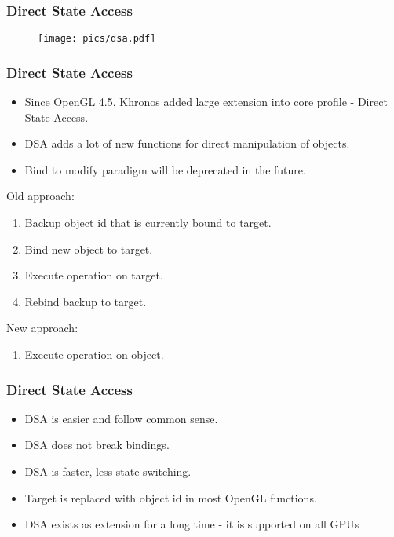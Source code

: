 
\begin{frame}[fragile]
\frametitle{Direct State Access}
	\begin{figure}[h]
	\texttt{[image: pics/dsa.pdf]}
	\end{figure}
\end{frame}

\begin{frame}
  \frametitle{Direct State Access}
  \begin{itemize}
    \item Since OpenGL 4.5, Khronos added large extension into core profile - Direct State Access.
    \item DSA adds a lot of new functions for direct manipulation of objects.
    \item Bind to modify paradigm will be deprecated in the future.
  \end{itemize}
  Old approach:
  \begin{enumerate}
    \item Backup object id that is currently bound to target.
    \item Bind new object to target.
    \item Execute operation on target.
    \item Rebind backup to target.
  \end{enumerate}
  New approach:
  \begin{enumerate}
    \item Execute operation on object.
  \end{enumerate}
\end{frame}

\begin{frame}
  \frametitle{Direct State Access}
  \begin{itemize}
    \item DSA is easier and follow common sense.
    \item DSA does not break bindings.
    \item DSA is faster, less state switching.
    \item Target is replaced with object id in most OpenGL functions.
    \item DSA exists as extension for a long time - it is supported on all GPUs
  \end{itemize}
\end{frame}

